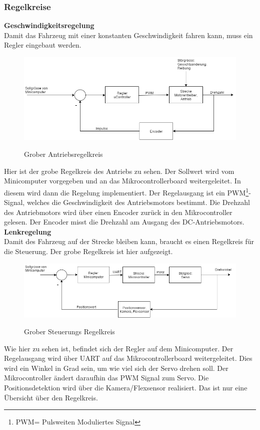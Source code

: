 \subsubsection{Regelkreise}
\textbf{Geschwindigkeitsregelung}\\[0.2cm]
Damit das Fahrzeug mit einer konstanten Geschwindigkeit fahren kann, muss ein Regler eingebaut werden.
\begin{figure}[H]
	\centering
	\includegraphics[width=1\textwidth]{03_Loesungskonzept/pictures/Gesch_Regelung.png}
	\label{Regelung_Gesch}
	\caption{Grober Antriebsregelkreis}
\end{figure}
Hier ist der grobe Regelkreis des Antriebs zu sehen. Der Sollwert wird vom Minicomputer vorgegeben und an das Mikrocontrollerboard weitergeleitet. In diesem wird dann die Regelung implementiert. Der Regelausgang ist ein PWM\footnote{PWM= Pulsweiten Moduliertes Signal}-Signal, welches die Geschwindigkeit des Antriebsmotors bestimmt. Die Drehzahl des Antriebmotors wird über einen Encoder zurück in den Mikrocontroller gelesen. Der Encoder misst die Drehzahl am Ausgang des DC-Antriebsmotors.\\[0.2cm]
\textbf{Lenkregelung}\\[0.2cm]
Damit des Fahrzeug auf der Strecke bleiben kann, braucht es einen Regelkreis für die Steuerung. Der grobe Regelkreis ist hier aufgezeigt.
\begin{figure}[H]
	\centering
	\includegraphics[width=1\textwidth]{03_Loesungskonzept/pictures/Lenk_Regelung.png}
	\label{Regelung_Lenken}
	\caption{Grober Steuerungs Regelkreis }
\end{figure}
Wie hier zu sehen ist, befindet sich der Regler auf dem Minicomputer. Der Regelausgang wird über UART auf das Mikrocontrollerboard weitergeleitet. Dies wird ein Winkel in Grad sein, um wie viel sich der Servo drehen soll. Der Mikrocontroller ändert daraufhin das PWM Signal zum Servo. Die Positionsdetektion wird über die Kamera/Flexsensor realisiert. Das ist nur eine Übersicht über den Regelkreis.
